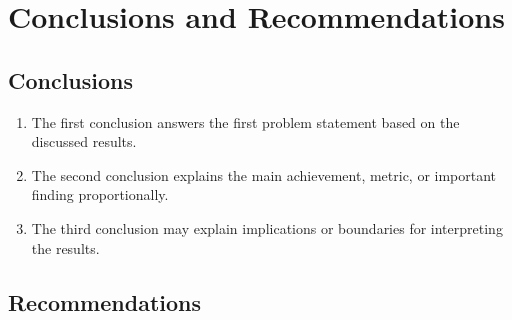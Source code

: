 \chapter{Conclusions and Recommendations}



\section{Conclusions}

\begin{enumerate}
  \item The first conclusion answers the first problem statement based on the discussed results.
  \item The second conclusion explains the main achievement, metric, or important finding proportionally.
  \item The third conclusion may explain implications or boundaries for interpreting the results.
\end{enumerate}

\section{Recommendations}
